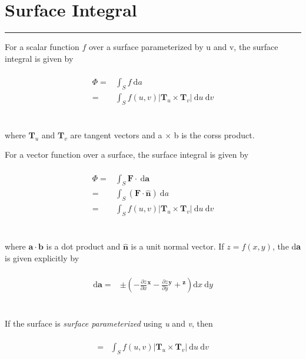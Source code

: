 \documentclass[letterpaper,10pt,fleqn]{article}
\numberwithin{equation}{section}
\newcommand{\D}{\mathrm{d}}
\begin{document}

\section*{Surface Integral}
\addtocounter{section}{1}
\hrule

For a scalar function \(f\) over a surface parameterized by u and v, the surface integral is given by
\\
\\
\begin{align}
  \Phi =& \displaystyle\int_S f \ \! \D a \\
  =& \displaystyle\int_S f(u, v)|\mathbf{T}_u \times \mathbf{T}_v| \ \! \D u \ \! \D v
\end{align}
\\
\\
where \(\mathbf{T}_u\) and \(\mathbf{T}_v\) are tangent vectors and a \(\times\) b is the corss product.

For a vector function over a surface, the surface integral is given by
\\
\\
\begin{align}
  \Phi =& \displaystyle\int_S \mathbf{F} \cdot \ \D \mathbf{a} \\
  =& \displaystyle\int_S (\mathbf{F} \cdot \mathbf{\hat{n}}) \ \D a \\
  =& \displaystyle\int_S f(u, v)|\mathbf{T}_u \times \mathbf{T}_v|\ \D u \ \D v
\end{align}
\\
\\
where \(\mathbf{a \cdot b}\) is a dot product and \(\mathbf{\hat{n}}\) is a unit normal vector. If \(z \! = \! f(x, y)\), the d\textbf{a} is given explicitly by
\\
\\
\begin{align}
  \D \mathbf{a} =& \pm \displaystyle(-\frac{\partial z}{\partial x}\mathbf{^x} - \frac{\partial z}{\partial y}\mathbf{^y} + \mathbf{^z}) \D x \ \D y
\end{align}
\\
\\
If the surface is \emph{surface parameterized} using \emph{u} and \emph{v}, then
\\
\\
\begin{align}
  =& \displaystyle\int_S f(u, v)|\mathbf{T}_u \times \mathbf{T}_v|\ \D u \ \D v
\end{align}
\\
\\
\end{document}
